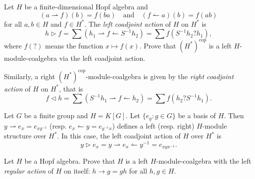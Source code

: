 \begin{exercise}
Let $H$ be a finite-dimensional Hopf algebra and 
\[
(a\rightharpoonup f)(b)=f(ba)
\quad\text{and}\quad 
(f\leftharpoonup a)(b)=f(ab)
\]
for all $a,b\in H$ and $f\in H^{*}$. The \emph{left coadjoint action}
of $H$ on $H^{*}$ is 
\[
h\triangleright f=\sum (h_{1}\rightharpoonup f\leftharpoonup S^{-1}h_{2})=\sum f(S^{-1}h_{2}?h_1),
\]
where $f(?)$ means the function $x\mapsto f(x)$. Prove that
$(H^*)^\mathrm{cop}$ is a left $H$-module-coalgebra via the left coadjoint
action. 
\end{exercise}

Similarly,  a right $(H^*)^\mathrm{cop}$-module-coalgebra is given by the \emph{right coadjoint action} of $H$ on $H^{*}$, that is
\[
f\triangleleft h=\sum (S^{-1}h_{1}\rightharpoonup f\leftharpoonup h_{2})=\sum f(h_2?S^{-1}h_{1}).
\]

\begin{example}
Let $G$ be a finite group and $H=K[G]$. Let $\{e_g:g\in G\}$ be a basis of $H$. Then 
$y\rightharpoonup e_{x}=e_{xy^{-1}}$ (resp. $e_{x}\leftharpoonup
y=e_{y^{-1}x}$) defines a left (resp. right) $H$-module structure over $H^{*}$. In this case, 
the left coadjoint action of $H$ over $H^{*}$ is 
\[
y\triangleright e_{x}=y\rightharpoonup e_{x}\leftharpoonup y^{-1}=e_{xyx^{-1}}.
\]
\end{example}

\begin{exercise}
Let $H$ be a Hopf algebra. 
Prove that $H$ is a left $H$-module-coalgebra with 
the left \emph{regular action} of $H$ on itself:
$h\rightarrow g=gh$ for all
$h,g\in H$. 
\end{exercise}


